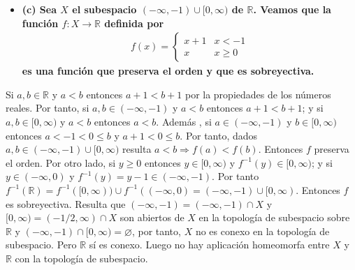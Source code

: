 \documentclass{article}
\begin{document}
\begin{itemize}
\item \bf (c) \rm Sea $X$ el subespacio $(-\infty,-1)\cup [0,\infty)$ de $\mathbb{R}$. Veamos que la función $f:X\rightarrow \mathbb{R}$ definida por
\begin{eqnarray}
f(x)=
\begin{cases}
x+1 & x<-1\nonumber\\
x & x\geq 0 \nonumber
\end{cases}
\end{eqnarray} 
es una función que preserva el orden y que es sobreyectiva.
\end{itemize}
Si $a,b\in \mathbb{R}$ y $a< b$ entonces $a+1<b+1$  por la propiedades de los números reales. Por tanto, si $a,b\in (-\infty,-1)$ y $a<b$ entonces $a+1<b+1$; y si $a,b\in [0,\infty)$ y $a<b$ entonces $a<b$. Además , si $a\in (-\infty,-1)$ y $b\in [0,\infty)$ entonces $a<-1<0\leq b$ y $ a+1<0\leq b$.  Por tanto, dados  $a,b\in (-\infty,-1)\cup [0,\infty)$ resulta $a<b\Rightarrow f(a)<f(b)$. Entonces $f$ preserva el orden. Por otro lado, si $y\geq 0$ entonces $y\in [0,\infty)$ y $f^{-1}(y)\in [0,\infty)$; y si $y\in (-\infty,0)$ y $f^{-1}(y)=y-1\in (-\infty,-1)$. Por tanto $f^{-1}(\mathbb{R})=f^{-1}([0,\infty))\cup f^{-1}((-\infty, 0)=(-\infty,-1)\cup [0,\infty)$. Entonces $f$ es sobreyectiva. Resulta que $(-\infty,-1)=(-\infty,-1)\cap X$ y $[0,\infty)=(-1/2,\infty)\cap X$ son abiertos de $X$ en la topología de subespacio sobre $\mathbb{R}$ y $(-\infty,-1)\cap [0,\infty)=\varnothing$, por tanto, $X$ no es conexo en la topología de subespacio. Pero $\mathbb{R}$ sí es conexo. Luego no hay aplicación homeomorfa entre $X$ y $\mathbb{R}$ con la topología de subespacio.
\end{document}
